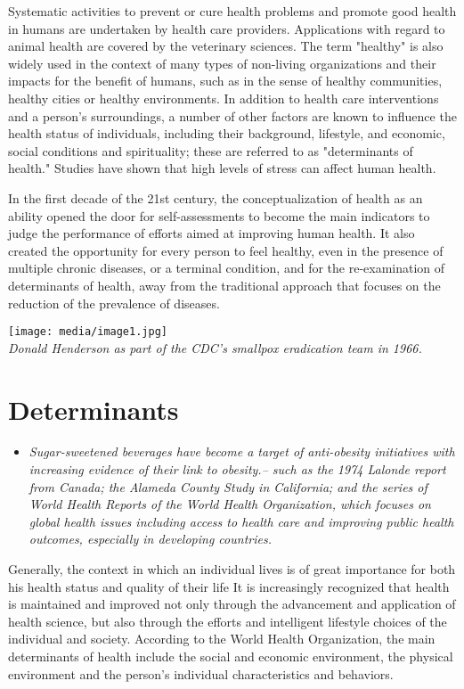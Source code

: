 Systematic activities to prevent or cure health problems and promote
good health in humans are undertaken by health care providers.
Applications with regard to animal health are covered by the veterinary
sciences. The term "healthy" is also widely used in the context of many
types of non-living organizations and their impacts for the benefit of
humans, such as in the sense of healthy communities, healthy cities or
healthy environments. In addition to health care interventions and a
person's surroundings, a number of other factors are known to influence
the health status of individuals, including their background, lifestyle,
and economic, social conditions and spirituality; these are referred to
as "determinants of health." Studies have shown that high levels of
stress can affect human health.

In the first decade of the 21st century, the conceptualization of health
as an ability opened the door for self-assessments to become the main
indicators to judge the performance of efforts aimed at improving human
health. It also created the opportunity for every person to feel
healthy, even in the presence of multiple chronic diseases, or a
terminal condition, and for the re-examination of determinants of
health, away from the traditional approach that focuses on the reduction
of the prevalence of diseases.

\texttt{[image: media/image1.jpg]}\\
\emph{Donald Henderson as part of the CDC's smallpox eradication team in
1966.}

\section{Determinants}\label{determinants}

\begin{itemize}
\item
  \emph{Sugar-sweetened beverages have become a target of anti-obesity
  initiatives with increasing evidence of their link to obesity.-- such
  as the 1974 Lalonde report from Canada; the Alameda County Study in
  California; and the series of World Health Reports of the World Health
  Organization, which focuses on global health issues including access
  to health care and improving public health outcomes, especially in
  developing countries.}
\end{itemize}

Generally, the context in which an individual lives is of great
importance for both his health status and quality of their life It is
increasingly recognized that health is maintained and improved not only
through the advancement and application of health science, but also
through the efforts and intelligent lifestyle choices of the individual
and society. According to the World Health Organization, the main
determinants of health include the social and economic environment, the
physical environment and the person's individual characteristics and
behaviors.

